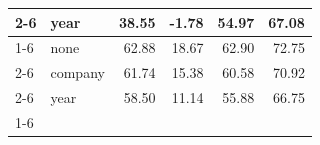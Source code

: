 \begin{table}
\begin{tabular}{llrrrr}
\cline{2-6}
 & year & {\cellcolor[HTML]{FFF5EB}} \color[HTML]{000000} 38.55 & {\cellcolor[HTML]{FFF5EB}} \color[HTML]{000000} -1.78 & {\cellcolor[HTML]{FFF5EB}} \color[HTML]{000000} 54.97 & {\cellcolor[HTML]{FEEDDB}} \color[HTML]{000000} 67.08 \\
\cline{1-6} \cline{2-6}
\multirow[c]{3}{*}{RF} & none & {\cellcolor[HTML]{7F2704}} \color[HTML]{F1F1F1} 62.88 & {\cellcolor[HTML]{7F2704}} \color[HTML]{F1F1F1} 18.67 & {\cellcolor[HTML]{B03903}} \color[HTML]{F1F1F1} 62.90 & {\cellcolor[HTML]{C34002}} \color[HTML]{F1F1F1} 72.75 \\
\cline{2-6}
 & company & {\cellcolor[HTML]{8C2C04}} \color[HTML]{F1F1F1} 61.74 & {\cellcolor[HTML]{B53B02}} \color[HTML]{F1F1F1} 15.38 & {\cellcolor[HTML]{F3701B}} \color[HTML]{F1F1F1} 60.58 & {\cellcolor[HTML]{F67925}} \color[HTML]{F1F1F1} 70.92 \\
\cline{2-6}
 & year & {\cellcolor[HTML]{BD3E02}} \color[HTML]{F1F1F1} 58.50 & {\cellcolor[HTML]{F06712}} \color[HTML]{F1F1F1} 11.14 & {\cellcolor[HTML]{FEEAD5}} \color[HTML]{000000} 55.88 & {\cellcolor[HTML]{FFF2E5}} \color[HTML]{000000} 66.75 \\
\cline{1-6} \cline{2-6}
\bottomrule
\end{tabular}
\end{table}
